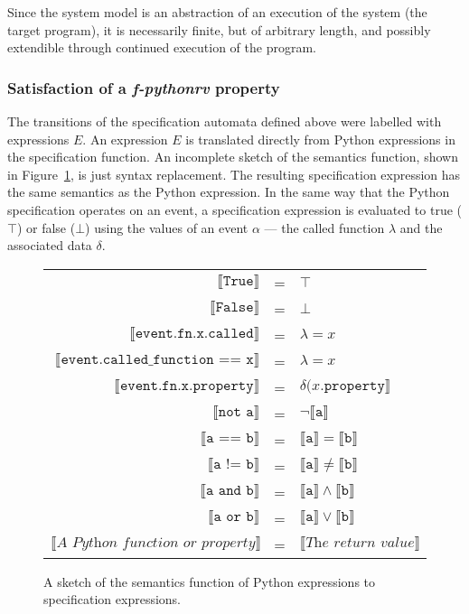Since the system model is an abstraction of an execution of the system (the
target program), it is necessarily finite, but of arbitrary length, and
possibly extendible through continued execution of the program.


\subsubsection{Satisfaction of a \textit{f-pythonrv} property}

The transitions of the specification automata defined above were labelled with
expressions $E$. An expression $E$ is translated directly from Python
expressions in the specification function. An incomplete sketch of the
semantics function, shown in Figure~\ref{figure-semantics-translation}, is
just syntax replacement. The resulting specification expression has the same
semantics as the Python expression. In the same way that the Python
specification operates on an event, a specification expression is evaluated to
true ($\top$) or false ($\bot$) using the values of an event $\alpha$ --- the
called function $\lambda$ and the associated data $\delta$.

\begin{figure}[h!]
	\begin{minipage}{0.9\textwidth}
		\centering
    \begin{tabular}{r c l}
      $\llbracket\texttt{True}\rrbracket$ & = & $\top$ \\
      $\llbracket\texttt{False}\rrbracket$ & = & $\bot$ \\
      $\llbracket\texttt{event.fn.x.called}\rrbracket$ & = & $\lambda = x$ \\
      $\llbracket\texttt{event.called\_function == x}\rrbracket$ & = & $\lambda = x$ \\
      $\llbracket\texttt{event.fn.x.property}\rrbracket$ & = & $\delta(x.\texttt{property}\rrbracket$ \\
      $\llbracket\texttt{not a}\rrbracket$ & = & $\neg \llbracket\texttt{a}\rrbracket$ \\
      $\llbracket\texttt{a == b}\rrbracket$ & = & $\llbracket\texttt{a}\rrbracket = \llbracket\texttt{b}\rrbracket$ \\
      $\llbracket\texttt{a != b}\rrbracket$ & = & $\llbracket\texttt{a}\rrbracket \neq \llbracket\texttt{b}\rrbracket$ \\
      $\llbracket\texttt{a and b}\rrbracket$ & = & $\llbracket\texttt{a}\rrbracket \wedge \llbracket\texttt{b}\rrbracket$ \\
      $\llbracket\texttt{a or b}\rrbracket$ & = & $\llbracket\texttt{a}\rrbracket \vee \llbracket\texttt{b}\rrbracket$ \\
      $\llbracket\textit{A Python function or property}\rrbracket$ & = & $\llbracket\textit{The return value}\rrbracket$ \\
    \end{tabular}
  \end{minipage}
  \caption{A sketch of the semantics function of Python expressions to
    specification expressions.}
  \label{figure-semantics-translation}
\end{figure}


